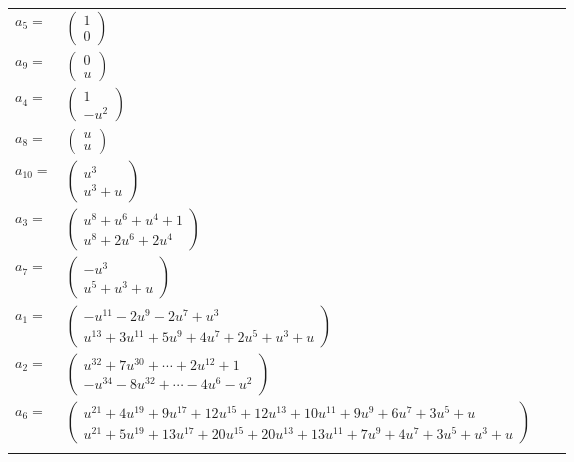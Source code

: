 \documentclass[1p]{elsarticle_modified}
\theoremstyle{definition}
\begin{document}
\begin{tabular}{m{7pt} m{180pt} m{7pt} m{180pt} }
\flushright $a_{5}=$&$\begin{pmatrix}1\\0\end{pmatrix}$ \\
\flushright $a_{9}=$&$\begin{pmatrix}0\\u\end{pmatrix}$ \\
\flushright $a_{4}=$&$\begin{pmatrix}1\\- u^2\end{pmatrix}$ \\
\flushright $a_{8}=$&$\begin{pmatrix}u\\u\end{pmatrix}$ \\
\flushright $a_{10}=$&$\begin{pmatrix}u^3\\u^3+u\end{pmatrix}$ \\
\flushright $a_{3}=$&$\begin{pmatrix}u^8+u^6+u^4+1\\u^8+2 u^6+2 u^4\end{pmatrix}$ \\
\flushright $a_{7}=$&$\begin{pmatrix}- u^3\\u^5+u^3+u\end{pmatrix}$ \\
\flushright $a_{1}=$&$\begin{pmatrix}- u^{11}-2 u^9-2 u^7+u^3\\u^{13}+3 u^{11}+5 u^9+4 u^7+2 u^5+u^3+u\end{pmatrix}$ \\
\flushright $a_{2}=$&$\begin{pmatrix}u^{32}+7 u^{30}+\cdots+2 u^{12}+1\\- u^{34}-8 u^{32}+\cdots-4 u^6- u^2\end{pmatrix}$ \\
\flushright $a_{6}=$&$\begin{pmatrix}u^{21}+4 u^{19}+9 u^{17}+12 u^{15}+12 u^{13}+10 u^{11}+9 u^9+6 u^7+3 u^5+u\\u^{21}+5 u^{19}+13 u^{17}+20 u^{15}+20 u^{13}+13 u^{11}+7 u^9+4 u^7+3 u^5+u^3+u\end{pmatrix}$\\&\end{tabular}
\end{document}
